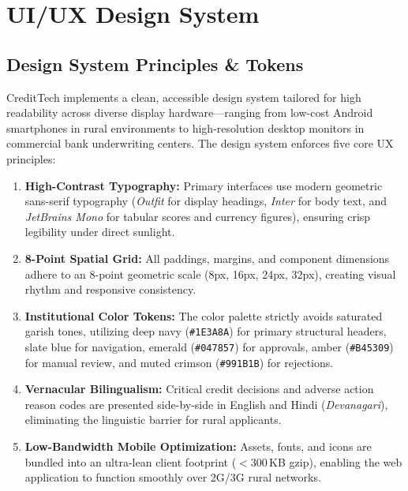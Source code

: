 \chapter{UI/UX Design System}
\label{chap:ui_ux}

\section{Design System Principles \& Tokens}
CreditTech implements a clean, accessible design system tailored for high readability across diverse display hardware---ranging from low-cost Android smartphones in rural environments to high-resolution desktop monitors in commercial bank underwriting centers. The design system enforces five core UX principles:

\begin{enumerate}
  \item \textbf{High-Contrast Typography:} Primary interfaces use modern geometric sans-serif typography (\textit{Outfit} for display headings, \textit{Inter} for body text, and \textit{JetBrains Mono} for tabular scores and currency figures), ensuring crisp legibility under direct sunlight.
  \item \textbf{8-Point Spatial Grid:} All paddings, margins, and component dimensions adhere to an 8-point geometric scale (8px, 16px, 24px, 32px), creating visual rhythm and responsive consistency.
  \item \textbf{Institutional Color Tokens:} The color palette strictly avoids saturated garish tones, utilizing deep navy (\texttt{\#1E3A8A}) for primary structural headers, slate blue for navigation, emerald (\texttt{\#047857}) for approvals, amber (\texttt{\#B45309}) for manual review, and muted crimson (\texttt{\#991B1B}) for rejections.
  \item \textbf{Vernacular Bilingualism:} Critical credit decisions and adverse action reason codes are presented side-by-side in English and Hindi (\textit{Devanagari}), eliminating the linguistic barrier for rural applicants.
  \item \textbf{Low-Bandwidth Mobile Optimization:} Assets, fonts, and icons are bundled into an ultra-lean client footprint ($<300$\,KB gzip), enabling the web application to function smoothly over 2G/3G rural networks.
\end{enumerate}

